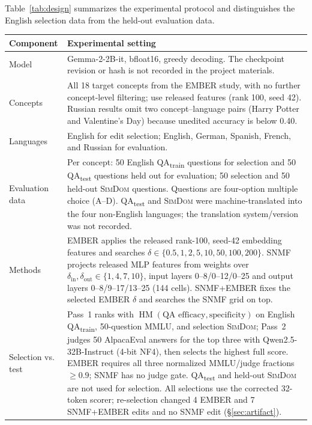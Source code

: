 \documentclass[11pt]{article}
\newcommand{\qatrain}{\textsc{QA}\textsubscript{train}}
\newcommand{\qatest}{\textsc{QA}\textsubscript{test}}
\begin{document}
Table~\ref{tab:design} summarizes the experimental protocol and distinguishes the English selection data from the held-out evaluation data.

\begin{table}[t]
\centering\small
\setlength{\tabcolsep}{5pt}
\renewcommand{\arraystretch}{1.08}
\begin{tabular}{@{}p{}p{}@{}}
\toprule
Component & Experimental setting \\
\midrule
Model & Gemma-2-2B-it, bfloat16, greedy decoding. The checkpoint revision or hash is not recorded in the project materials. \\
Concepts & All 18 target concepts from the EMBER study, with no further concept-level filtering; use released features (rank 100, seed 42). Russian results omit two concept--language pairs (Harry Potter and Valentine's Day) because unedited accuracy is below 0.40. \\
Languages & English for edit selection; English, German, Spanish, French, and Russian for evaluation. \\
Evaluation data & Per concept: 50 English \qatrain{} questions for selection and 50 \qatest{} questions held out for evaluation; 50 selection and 50 held-out \textsc{SimDom} questions. Questions are four-option multiple choice (A--D). \qatest{} and \textsc{SimDom} were machine-translated into the four non-English languages; the translation system/version was not recorded. \\
Methods & EMBER applies the released rank-100, seed-42 embedding features and searches $\delta \in \{0.5,1,2,5,10,50,100,200\}$. SNMF projects released MLP features from weights over $\delta_{\mathrm{in}},\delta_{\mathrm{out}}\in\{1,4,7,10\}$, input layers 0--8/0--12/0--25 and output layers 0--8/9--17/13--25 (144 cells). SNMF+EMBER fixes the selected EMBER $\delta$ and searches the SNMF grid on top. \\
Selection vs. test & Pass~1 ranks with $\operatorname{HM}(\text{QA efficacy},\text{specificity})$ on English \qatrain{}, 50-question MMLU, and selection \textsc{SimDom}; Pass~2 judges 50 AlpacaEval answers for the top three with Qwen2.5-32B-Instruct (4-bit NF4), then selects the highest full score. EMBER requires all three normalized MMLU/judge fractions $\geq 0.9$; SNMF has no judge gate. \qatest{} and held-out \textsc{SimDom} are not used for selection. All selections use the corrected 32-token scorer; re-selection changed 4 EMBER and 7 SNMF+EMBER edits and no SNMF edit (\S\ref{sec:artifact}). \\

\end{tabular}
\end{table}
\end{document}
